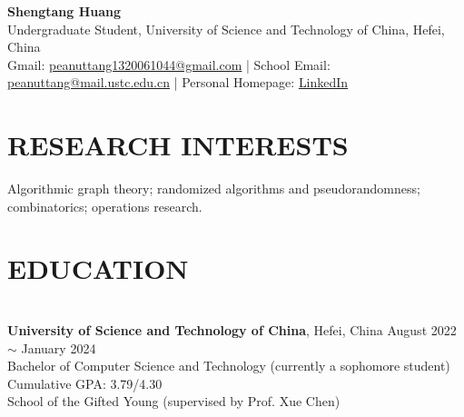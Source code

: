 \documentclass[a4paper,9pt]{extarticle}
\begin{document}
\pagestyle{fancy}
\renewcommand{\headrulewidth}{0pt}
\fancyhead{}
\fancyhead[R]{\textit{\today}}
\thispagestyle{empty} %

\begin{flushleft}
\textbf{\LARGE Shengtang Huang}\\[2pt] %
Undergraduate Student, University of Science and Technology of China, Hefei, China
\\ Gmail: \href{mailto:peanuttang1320061044@gmail.com}{peanuttang1320061044@gmail.com} | School Email: \href{mailto:peanuttang@mail.ustc.edu.cn}{peanuttang@mail.ustc.edu.cn} | Personal Homepage: \href{https://shengtanghuang.netlify.app/about/}{LinkedIn} %
\end{flushleft}

\section*{RESEARCH INTERESTS}
\noindent
Algorithmic graph theory; randomized algorithms and pseudorandomness; combinatorics; operations research.
\section*{EDUCATION}

\noindent\\
\textbf{University of Science and Technology of China},  Hefei, China \hfill August 2022 $\sim$ January 2024\\ %
Bachelor of Computer Science and Technology (currently a sophomore student) \hfill Cumulative GPA: 3.79/4.30 \\
School of the Gifted Young (supervised by Prof. Xue Chen)

\end{document}
